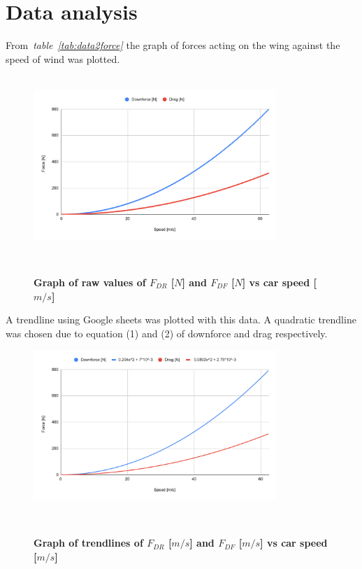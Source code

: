 \documentclass[11pt, a4paper]{article}
\begin{document}
\section{Data analysis}
From~\textit{table~\ref{tab:data2force}} the graph of forces acting on the wing against the speed of wind was plotted. \\\\
\begin{figure}[H]
    \centering
    \caption{\textbf{Graph of raw values of $F_{DR}$ [$N$] and $F_{DF}$ [$N$] vs car speed [$m/s$] }}
    \includegraphics[width=0.82\textwidth]{graphs/DF_DR_VS_VElocity.pdf}
    
~\label{fig:raw_graph1}
\end{figure}
A trendline using Google sheets was plotted with this data. A quadratic trendline was chosen due to equation (1) and (2) of downforce and drag respectively.
\begin{figure}[H]
    \centering
    \caption{\textbf{Graph of trendlines of $F_{DR}$ [$m/s$] and $F_{DF}$ [$m/s$] vs car speed [$m/s$]}}
    \includegraphics[width=0.82\textwidth]{graphs/DF_DR_VS_VElocity_trend.pdf}
    
~\label{fig:trend_graph1}
\end{figure}
\end{document}
